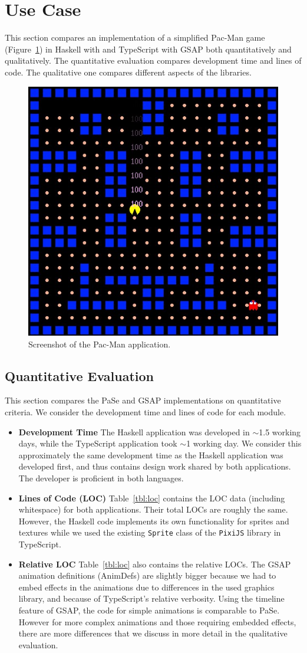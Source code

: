 \section{Use Case}

This section compares an implementation of a simplified Pac-Man game (Figure~\ref{fig:pacman}) in Haskell
with \dsl{} and TypeScript with GSAP both quantitatively and qualitatively. The
quantitative evaluation compares development time and lines
of code. The qualitative one compares different aspects of the 
libraries.

\begin{figure}[h]{\textwidth}
\centering
\includegraphics[width=.3\textwidth]{pictures/pacman}
\caption{Screenshot of the Pac-Man application.}
\label{fig:pacman}
\end{figure}

\subsection{Quantitative Evaluation}

This section compares the PaSe and GSAP implementations on
quantitative criteria. We consider the development time and lines of code for
each module.

\begin{itemize}
\item \textbf{Development Time} The Haskell application was developed in
$\sim$1.5 working days, while the TypeScript application took $\sim$1 working
day. We consider this approximately the same development time as the Haskell application
was developed first, and thus contains design work shared by both
applications. The developer is proficient in both languages.
\item \textbf{Lines of Code (LOC)} Table~\ref{tbl:loc} contains the LOC data
(including whitespace) for both applications. Their total LOCs are roughly the same. However, the Haskell
code implements its own functionality for sprites and
textures while we used the existing
\texttt{Sprite} class of the \texttt{PixiJS} library in TypeScript.
\item \textbf{Relative LOC} Table~\ref{tbl:loc} also contains the relative
LOCs. The GSAP animation definitions (AnimDefs) are slightly bigger because
we had to embed effects in the animations due to differences
in the used graphics library, and because of TypeScript's relative verbosity.
Using the timeline feature of GSAP, the code for
simple animations is comparable to PaSe. However for more complex animations
and those requiring embedded effects, there are more differences that we
discuss in more detail in the qualitative evaluation.
\end{itemize}

